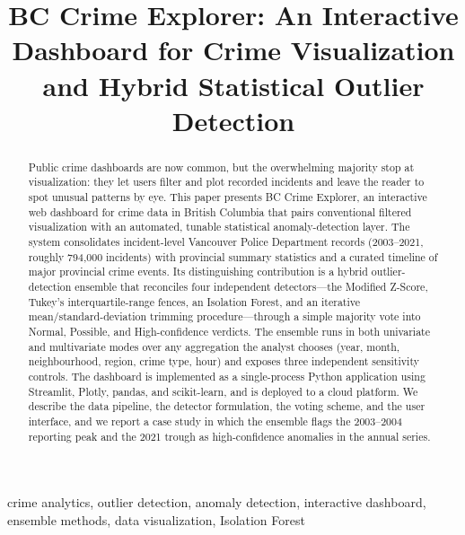 \documentclass[conference]{IEEEtran}
\begin{document}
\title{BC Crime Explorer: An Interactive Dashboard for Crime Visualization and Hybrid Statistical Outlier Detection}

\author{
}

\maketitle

\begin{abstract}
Public crime dashboards are now common, but the overwhelming majority stop at visualization: they let users filter and plot recorded incidents and leave the reader to spot unusual patterns by eye. This paper presents BC Crime Explorer, an interactive web dashboard for crime data in British Columbia that pairs conventional filtered visualization with an automated, tunable statistical anomaly-detection layer. The system consolidates incident-level Vancouver Police Department records (2003--2021, roughly 794{,}000 incidents) with provincial summary statistics and a curated timeline of major provincial crime events. Its distinguishing contribution is a hybrid outlier-detection ensemble that reconciles four independent detectors---the Modified Z-Score, Tukey's interquartile-range fences, an Isolation Forest, and an iterative mean/standard-deviation trimming procedure---through a simple majority vote into Normal, Possible, and High-confidence verdicts. The ensemble runs in both univariate and multivariate modes over any aggregation the analyst chooses (year, month, neighbourhood, region, crime type, hour) and exposes three independent sensitivity controls. The dashboard is implemented as a single-process Python application using Streamlit, Plotly, pandas, and scikit-learn, and is deployed to a cloud platform. We describe the data pipeline, the detector formulation, the voting scheme, and the user interface, and we report a case study in which the ensemble flags the 2003--2004 reporting peak and the 2021 trough as high-confidence anomalies in the annual series.
\end{abstract}

\begin{IEEEkeywords}
crime analytics, outlier detection, anomaly detection, interactive dashboard, ensemble methods, data visualization, Isolation Forest
\end{IEEEkeywords}
\end{document}
